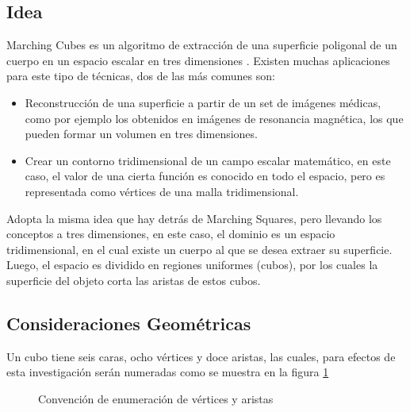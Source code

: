 \subsection{Idea}
\label{subsec:marchingCubes:idea}

Marching Cubes es un algoritmo de extracción de una superficie poligonal de un cuerpo
en un espacio escalar en tres dimensiones \cite{Lorensen87marchingcubes}. Existen muchas aplicaciones para este tipo de técnicas,
dos de las más comunes son:

\begin{itemize}
	\item Reconstrucción de una superficie a partir de un set de imágenes médicas, como
	por ejemplo los obtenidos en imágenes de resonancia magnética, los que pueden formar
	un volumen en tres dimensiones.

	\item Crear un contorno tridimensional de un campo escalar matemático, en este caso,
	el valor de una cierta función es conocido en todo el espacio, pero es representada como
	vértices de una malla tridimensional.
\end{itemize}

Adopta la misma idea que hay detrás de Marching Squares, pero llevando los conceptos a
tres dimensiones, en este caso, el dominio es un espacio tridimensional, en el cual existe un
cuerpo al que se desea extraer su superficie. Luego, el espacio es dividido en regiones uniformes
(cubos), por los cuales la superficie del objeto corta las aristas de estos cubos.

\subsection{Consideraciones Geométricas}
\label{subsec:marchingCubes:consideracionesGeometricas}

Un cubo tiene seis caras, ocho vértices y doce aristas, las cuales, para efectos de esta
investigación serán numeradas como se muestra en la figura \ref{f:estadoDelArte:convention}

\begin{figure}[hbp]
\centering
\caption{Convención de enumeración de vértices y aristas}
\label{f:estadoDelArte:convention}
\end{figure}


